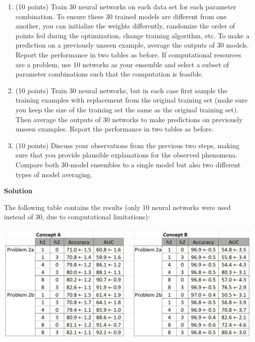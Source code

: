 \documentclass[twoside]{article}
\begin{document}
\begin{enumerate}
\item (10 points) Train 30 neural networks on each data set for each parameter combination. To ensure these 30 trained models are different from one another, you can initialize the weights differently, randomize the order of points fed during the optimization, change training algorithm, etc. To make a prediction on a previously unseen example, average the outputs of 30 models. Report the performance in two tables as before. If computational resources are a problem, use 10 networks as your ensemble and select a subset of parameter combinations such that the computation is feasible.
\item (10 points) Train 30 neural networks, but in each case first sample the training examples with replacement from the original training set (make sure you keep the size of the training set the same as the original training set). Then average the outputs of 30 networks to make predictions on previously unseen examples. Report the performance in two tables as before.
\item (10 points) Discuss your observations from the previous two steps, making sure that you provide plausible explanations for the observed phenomena. Compare both 30-model ensembles to a single model but also two different types of model averaging.
\end{enumerate}

\textbf{Solution}

The following table contains the results (only 10 neural networks were used instead of 30, due to computational limitations):

\includegraphics{Q2}
\end{document}
